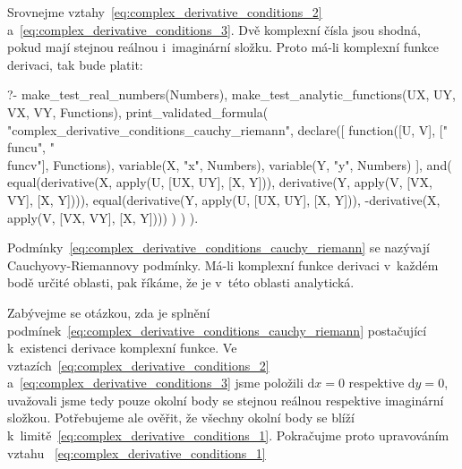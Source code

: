Srovnejme vztahy~\eqref{eq:complex_derivative_conditions_2} a~\eqref{eq:complex_derivative_conditions_3}. Dvě komplexní čísla jsou shodná, pokud mají stejnou reálnou i~imaginární složku. Proto má-li komplexní funkce derivaci, tak bude platit:

\begin{prolog}
?-	make_test_real_numbers(Numbers),
	make_test_analytic_functions(UX, UY, VX, VY, Functions),
	print_validated_formula(
		"complex_derivative_conditions_cauchy_riemann",
		declare([
			function([U, V], ["\\func{u}", "\\func{v}"], Functions),
			variable(X, "x", Numbers),
			variable(Y, "y", Numbers)
		],
			and(
				equal(derivative(X, apply(U, [UX, UY], [X, Y])), derivative(Y, apply(V, [VX, VY], [X, Y]))),
				equal(derivative(Y, apply(U, [UX, UY], [X, Y])), -derivative(X, apply(V, [VX, VY], [X, Y])))
			)
		)
	).
\end{prolog}

Podmínky~\eqref{eq:complex_derivative_conditions_cauchy_riemann} se nazývají Cauchyovy-Riemannovy podmínky. 
Má-li komplexní funkce derivaci v~každém bodě určité oblasti, pak říkáme, že je v~této oblasti analytická.

Zabývejme se otázkou, zda je splnění podmínek~\eqref{eq:complex_derivative_conditions_cauchy_riemann} postačující k~existenci derivace komplexní funkce. Ve vztazích~\eqref{eq:complex_derivative_conditions_2} a~\eqref{eq:complex_derivative_conditions_3} jsme položili \(\mathrm{d}x = 0\) respektive \(\mathrm{d}y = 0\), uvažovali jsme tedy pouze okolní body se stejnou reálnou respektive imaginární složkou. Potřebujeme ale ověřit, že všechny okolní body se blíží k~limitě~\eqref{eq:complex_derivative_conditions_1}. Pokračujme proto upravováním vztahu
~\eqref{eq:complex_derivative_conditions_1}

